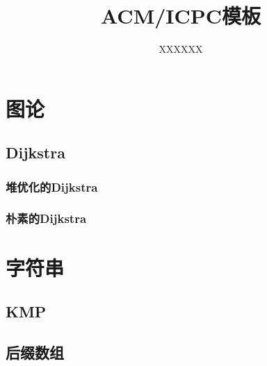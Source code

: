 \documentclass[twocolumn,4paper]{article}
\title{\CJKfamily{hei} \bfseries ACM/ICPC模板}
\author{XXXXXX}
\begin{document}
	\begin{titlepage}
		\maketitle
		\thispagestyle{empty}
	\end{titlepage}
    \renewcommand{\contentsname}{目录}
    \tableofcontents
    \thispagestyle{empty}
    \newpage
    
    \onecolumn
    \setcounter{page}{1}   %
    \newpage
    \section{图论}
        \subsection{Dijkstra}
            \subsubsection{堆优化的Dijkstra}
                
            \subsubsection{朴素的Dijkstra}
                
    \newpage
    \section{字符串}
        \subsection{KMP}
            
        \subsection{后缀数组}
            

\end{document}
